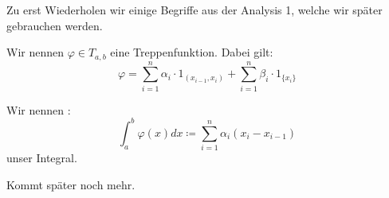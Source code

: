 \begin{recall}
Zu erst Wiederholen wir einige Begriffe aus der Analysis 1, welche wir später gebrauchen werden.
\begin{definition}[Treppenfunktion]
	Wir nennen $\varphi \in T_{a,b}$ eine Treppenfunktion. Dabei gilt:
	\[
		\varphi = \sum_{i=1}^{n}\alpha_i \cdot 1_{(x_{i-1},x_{i})} + \sum_{i=1}^{n}\beta_i \cdot 1_{\{x_{i}\}}
	\]
\end{definition}
\begin{definition}[Integral]
Wir nennen :
\[
	\int_{a}^{b}\varphi(x) dx \coloneqq \sum_{i=1}^{n}\alpha_i (x_{i}-x_{i-1})
\]
unser Integral.
\end{definition}

Kommt später noch mehr.
\end{recall}
